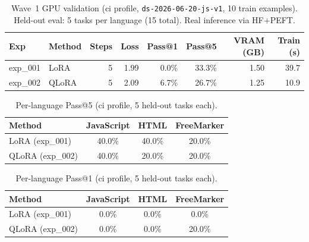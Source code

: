 
\begin{table}[h]
\centering
\caption{Wave~1 GPU validation (ci profile, \texttt{ds-2026-06-20-js-v1}, 10 train examples).
Held-out eval: 5 tasks per language (15 total). Real inference via HF+PEFT.}
\label{tab:wave1-ci}
\small
\begin{tabular}{llrrrrrr}
\toprule
Exp & Method & Steps & Loss & Pass@1 & Pass@5 & VRAM (GB) & Train (s) \\
\midrule
exp\_001 & LoRA & 5 & 1.99 & 0.0\% & 33.3\% & 1.50 & 39.7 \\
exp\_002 & QLoRA & 5 & 2.09 & 6.7\% & 26.7\% & 1.25 & 10.9 \\
\bottomrule
\end{tabular}
\end{table}

\begin{table}[h]
\centering
\caption{Per-language Pass@5 (ci profile, 5 held-out tasks each).}
\label{tab:wave1-ci-by-lang}
\small
\begin{tabular}{lccc}
\toprule
Method & JavaScript & HTML & FreeMarker \\
\midrule
LoRA (exp\_001) & 40.0\% & 40.0\% & 20.0\% \\
QLoRA (exp\_002) & 40.0\% & 20.0\% & 20.0\% \\
\bottomrule
\end{tabular}
\end{table}

\begin{table}[h]
\centering
\caption{Per-language Pass@1 (ci profile, 5 held-out tasks each).}
\label{tab:wave1-ci-pass1-by-lang}
\small
\begin{tabular}{lccc}
\toprule
Method & JavaScript & HTML & FreeMarker \\
\midrule
LoRA (exp\_001) & 0.0\% & 0.0\% & 0.0\% \\
QLoRA (exp\_002) & 0.0\% & 0.0\% & 20.0\% \\
\bottomrule
\end{tabular}
\end{table}
